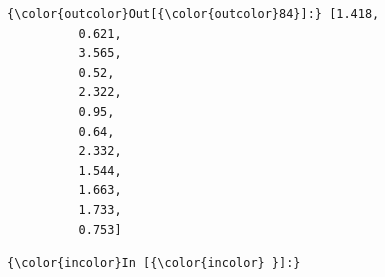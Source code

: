 \documentclass[8pt,onecolumn,aps,pra]{revtex4-1}
\begin{document}
\begin{Verbatim}[commandchars=\\\{\}]
{\color{outcolor}Out[{\color{outcolor}84}]:} [1.418,
          0.621,
          3.565,
          0.52,
          2.322,
          0.95,
          0.64,
          2.332,
          1.544,
          1.663,
          1.733,
          0.753]
\end{Verbatim}
            \begin{Verbatim}[commandchars=\\\{\}]
{\color{incolor}In [{\color{incolor} }]:} 
\end{Verbatim}


    
    


    
    
\end{document}
